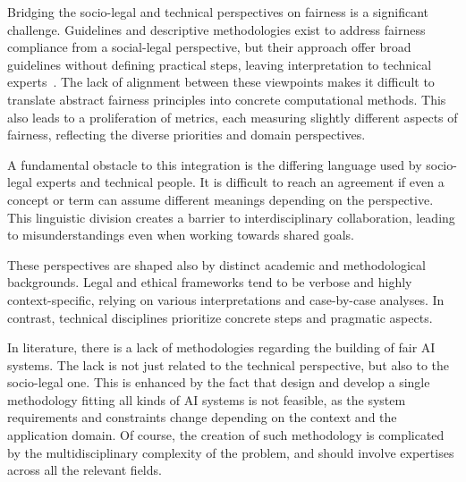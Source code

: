 \documentclass[12pt,a4paper,openright,twoside]{book}
\begin{document}
Bridging the socio-legal and technical perspectives on fairness is a significant challenge. 
%
Guidelines and descriptive methodologies exist to address fairness compliance from a social-legal perspective, but their approach offer broad guidelines without defining practical steps, leaving interpretation to technical experts~\cite{hicssfairness2025}.
%
The lack of alignment between these viewpoints makes it difficult to translate abstract fairness principles into concrete computational methods.
%
This also leads to a proliferation of metrics, each measuring slightly different aspects of fairness, reflecting the diverse priorities and domain perspectives.


A fundamental obstacle to this integration is the differing language used by socio-legal experts and technical people.
%
It is difficult to reach an agreement if even a concept or term can assume different meanings depending on the perspective.
This linguistic division creates a barrier to interdisciplinary collaboration, leading to misunderstandings even when working towards shared goals.



These perspectives are shaped also by distinct academic and methodological backgrounds.
%
Legal and ethical frameworks tend to be verbose and highly context-specific, relying on various interpretations and case-by-case analyses.
%
In contrast, technical disciplines prioritize concrete steps and pragmatic aspects.


In literature, there is a lack of methodologies regarding the building of fair \ac{AI} systems.
%
The lack is not just related to the technical perspective, but also to the socio-legal one.
%
This is enhanced by the fact that design and develop a single methodology fitting all kinds of \ac{AI} systems is not feasible, as the system requirements and constraints change depending on the context and the application domain.
%
Of course, the creation of such methodology is complicated by the multidisciplinary complexity of the problem, and should involve expertises across all the relevant fields.
\end{document}

